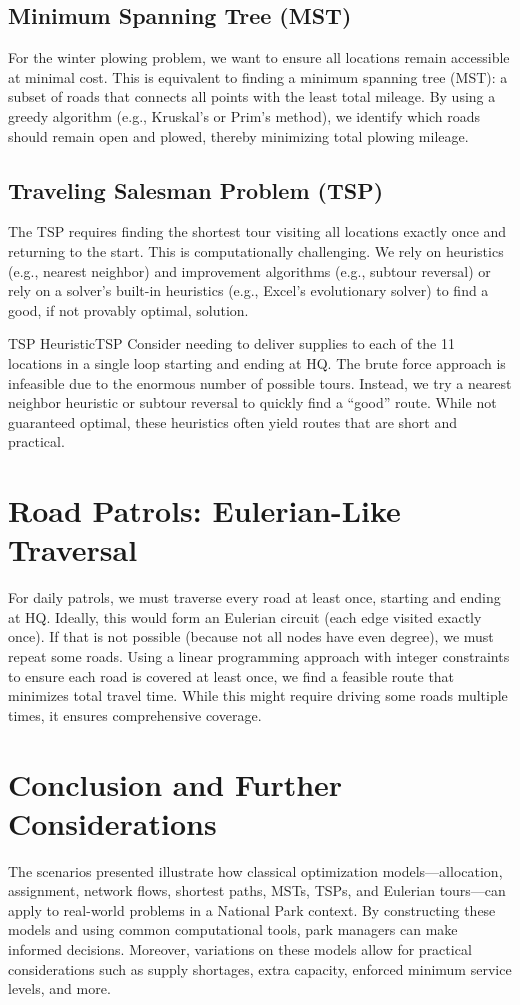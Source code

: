 \subsection{Minimum Spanning Tree (MST)}
For the winter plowing problem, we want to ensure all locations remain accessible at minimal cost. This is equivalent to finding a minimum spanning tree (MST): a subset of roads that connects all points with the least total mileage. By using a greedy algorithm (e.g., Kruskal’s or Prim’s method), we identify which roads should remain open and plowed, thereby minimizing total plowing mileage.

\subsection{Traveling Salesman Problem (TSP)}
The TSP requires finding the shortest tour visiting all locations exactly once and returning to the start. This is computationally challenging. We rely on heuristics (e.g., nearest neighbor) and improvement algorithms (e.g., subtour reversal) or rely on a solver’s built-in heuristics (e.g., Excel’s evolutionary solver) to find a good, if not provably optimal, solution.

\begin{example}{TSP Heuristic}{TSP}
Consider needing to deliver supplies to each of the 11 locations in a single loop starting and ending at HQ. The brute force approach is infeasible due to the enormous number of possible tours. Instead, we try a nearest neighbor heuristic or subtour reversal to quickly find a “good” route. While not guaranteed optimal, these heuristics often yield routes that are short and practical.
\end{example}

\section{Road Patrols: Eulerian-Like Traversal}
For daily patrols, we must traverse every road at least once, starting and ending at HQ. Ideally, this would form an Eulerian circuit (each edge visited exactly once). If that is not possible (because not all nodes have even degree), we must repeat some roads. Using a linear programming approach with integer constraints to ensure each road is covered at least once, we find a feasible route that minimizes total travel time. While this might require driving some roads multiple times, it ensures comprehensive coverage.

\section{Conclusion and Further Considerations}
The scenarios presented illustrate how classical optimization models—allocation, assignment, network flows, shortest paths, MSTs, TSPs, and Eulerian tours—can apply to real-world problems in a National Park context. By constructing these models and using common computational tools, park managers can make informed decisions. Moreover, variations on these models allow for practical considerations such as supply shortages, extra capacity, enforced minimum service levels, and more.

